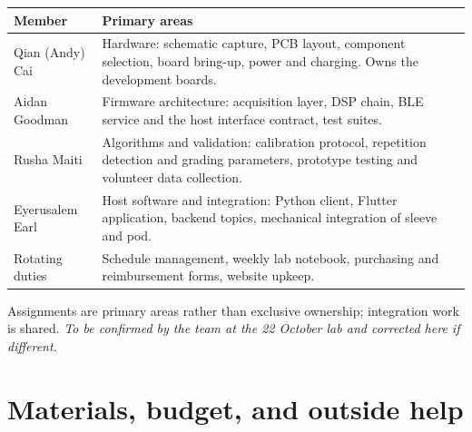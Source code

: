 \documentclass[11pt]{article}
\begin{document}
\begin{table}[H]
\centering\small
\begin{tabularx}{\linewidth}{@{}p{34mm} X@{}}
\toprule
\textbf{Member} & \textbf{Primary areas} \\
\midrule
Qian (Andy) Cai & Hardware: schematic capture, PCB layout, component selection, board bring-up, power and charging. Owns the development boards. \\
Aidan Goodman & Firmware architecture: acquisition layer, DSP chain, BLE service and the host interface contract, test suites. \\
Rusha Maiti & Algorithms and validation: calibration protocol, repetition detection and grading parameters, prototype testing and volunteer data collection. \\
Eyerusalem Earl & Host software and integration: Python client, Flutter application, backend topics, mechanical integration of sleeve and pod. \\
\midrule
Rotating duties & Schedule management, weekly lab notebook, purchasing and reimbursement forms, website upkeep. \\
\bottomrule
\end{tabularx}
\end{table}

\noindent
Assignments are primary areas rather than exclusive ownership; integration work
is shared. \textit{To be confirmed by the team at the 22 October lab and
corrected here if different.}

\section{Materials, budget, and outside help}
\end{document}
